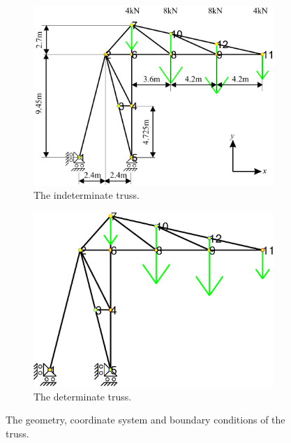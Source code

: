 \documentclass{article}
\begin{document}
\begin{figure}[H]
    \centering
        \begin{subfigure}{0.49\textwidth}
            \includegraphics[width=1\linewidth]{figures/indeterminate.pdf} 
            \caption{The indeterminate truss.}
            \label{fig:truss_indeterminate}
        \end{subfigure}
        \begin{subfigure}{0.49\textwidth}
            \includegraphics[width=1\linewidth]{figures/determinate.eps} 
            \caption{The determinate truss.}
            \label{fig:truss_determinate}
        \end{subfigure}
    \caption{The geometry, coordinate system and boundary conditions of the truss.}
    \label{fig:truss}
\end{figure}
\end{document}
